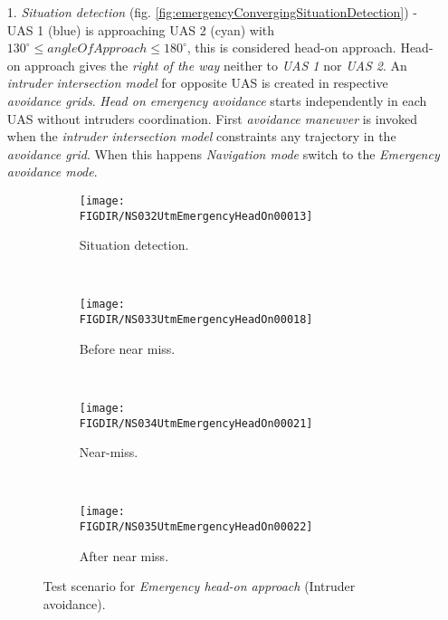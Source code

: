 \begin{itemize}
    \item[1.] \emph{Situation detection} (fig. \ref{fig:emergencyConvergingSituationDetection}) - UAS 1 (blue)  is approaching UAS 2 (cyan) with $130^\circ \le angle Of Approach \le 180^\circ$, this is considered head-on approach. Head-on approach  gives the \emph{right of the way} neither to \emph{UAS 1} nor \emph{UAS 2}. An \emph{intruder intersection model} for opposite UAS is created in respective \emph{avoidance grids}. \emph{Head on emergency avoidance} starts independently in each UAS without intruders coordination. First \emph{avoidance maneuver} is invoked when the \emph{intruder intersection model} constraints any trajectory in the \emph{avoidance grid}. When this happens \emph{Navigation mode} switch to the \emph{Emergency avoidance mode}.
    
\begin{figure}[H]
    \centering
    \begin{subfigure}{0.75\textwidth}
        \centering
        \texttt{[image: \\FIGDIR/NS032UtmEmergencyHeadOn00013]}
        \caption{Situation detection.}
        \label{fig:emergencyHeadOnSituationDetection}
    \end{subfigure}
    \\
    \begin{subfigure}{0.75\textwidth}
        \centering
        \texttt{[image: \\FIGDIR/NS033UtmEmergencyHeadOn00018]} 
        \caption{Before near miss.}
        \label{fig:emergencyHeadOnBeforeNearMiss}
    \end{subfigure}
    \\
    \begin{subfigure}{0.75\textwidth}
        \centering
        \texttt{[image: \\FIGDIR/NS034UtmEmergencyHeadOn00021]} 
        \caption{Near-miss.}
        \label{fig:emergencyHeadOnNearMiss}
    \end{subfigure}
    \\
    \begin{subfigure}{0.75\textwidth}
        \centering
        \texttt{[image: \\FIGDIR/NS035UtmEmergencyHeadOn00022]} 
        \caption{After near miss.}
        \label{fig:emergencyHeadOnAfterNearMiss}
    \end{subfigure}
    \caption{Test scenario for \emph{Emergency head-on approach} (Intruder avoidance). }
    \label{fig:testCaseEmergencyHeadOnApproach}
\end{figure}
                

\end{itemize}
